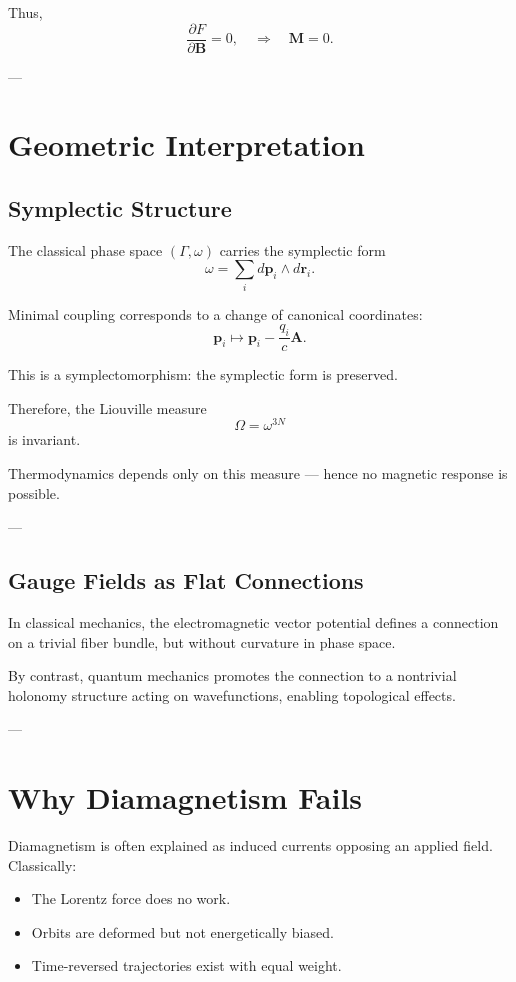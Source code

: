 \documentclass[11pt]{article}
\begin{document}
Thus,
\[
\frac{\partial F}{\partial \mathbf{B}} = 0,
\quad \Rightarrow \quad \mathbf{M} = 0.
\]

---

\section{Geometric Interpretation}

\subsection{Symplectic Structure}

The classical phase space $(\Gamma,\omega)$ carries the symplectic form
\[
\omega = \sum_i d\mathbf{p}_i \wedge d\mathbf{r}_i.
\]

Minimal coupling corresponds to a change of canonical coordinates:
\[
\mathbf{p}_i \mapsto \mathbf{p}_i - \frac{q_i}{c}\mathbf{A}.
\]

This is a symplectomorphism: the symplectic form is preserved.

Therefore, the Liouville measure
\[
\Omega = \omega^{3N}
\]
is invariant.

Thermodynamics depends only on this measure — hence no magnetic response is possible.

---

\subsection{Gauge Fields as Flat Connections}

In classical mechanics, the electromagnetic vector potential defines a connection on a trivial fiber bundle, but without curvature in phase space.

By contrast, quantum mechanics promotes the connection to a nontrivial holonomy structure acting on wavefunctions, enabling topological effects.

---

\section{Why Diamagnetism Fails}

Diamagnetism is often explained as induced currents opposing an applied field. Classically:

\begin{itemize}
\item The Lorentz force does no work.
\item Orbits are deformed but not energetically biased.
\item Time-reversed trajectories exist with equal weight.
\end{itemize}
\end{document}
